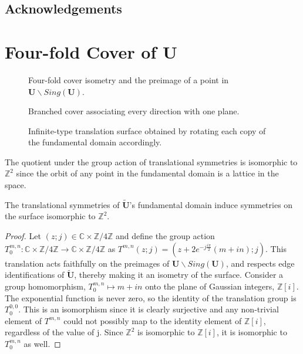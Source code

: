 \documentclass[]{article}
\begin{document}
\subsection{Acknowledgements}

\section{Four-fold Cover of $\mathbf{U}$}

\begin{figure}[H]
\centering
\hspace{0.5in}
\caption{Four-fold cover isometry and the preimage of a point in $\mathbf U \backslash Sing(\mathbf U)$.}
\end{figure}

\begin{figure}[H]
\centering

\label{fig:utilda0}
\caption{Branched cover associating every direction with one plane.}
\end{figure}

\begin{figure}[H]
\centering

\caption{Infinite-type translation surface obtained by rotating each copy of the fundamental domain accordingly.}
\label{fig:utilda}
\end{figure}

The quotient under the group action of translational symmetries is isomorphic to $\mathbb{Z}^2$ since the orbit of any point in the fundamental domain is a lattice in the space. 

\begin{thm}
The translational symmetries of $\tilde{\mathbf{U}}$'s fundamental domain induce symmetries on the surface isomorphic to $\mathbb{Z}^2$.
\begin{proof}
Let $(z;j)\in\mathbb{C}\times\mathbb{Z}/4\mathbb{Z}$ and define the group action $T_0^{m,n}:\mathbb{C}\times\mathbb{Z}/4\mathbb{Z}\rightarrow\mathbb{C}\times\mathbb{Z}/4\mathbb{Z}$ as $T^{m,n}(z;j)=(z+2e^{-j\frac{i\pi}{2}}(m+in);j)$. This translation acts faithfully on the preimages of $\mathbf{U}\backslash Sing(\mathbf{U})$, and respects edge identifications of $\mathbf{\tilde{\mathbf{U}}}$, thereby making it an isometry of the surface. Consider a group homomorphism, $T_0^{m,n}\mapsto m+in$ onto the plane of Gaussian integers, $\mathbb{Z}[i]$. The exponential function is never zero, so the identity of the translation group is $T_0^{0,0}$. This is an isomorphism since it is clearly surjective and any non-trivial element of $T^{m,n}$ could not possibly map to the identity element of $\mathbb{Z}[i]$, regardless of the value of j. Since $\mathbb{Z}^2$ is isomorphic to $\mathbb{Z}[i]$, it is isomorphic to  $T_0^{m,n}$ as well.
\end{proof}
\label{thm:z2}
\end{thm}
\end{document}
